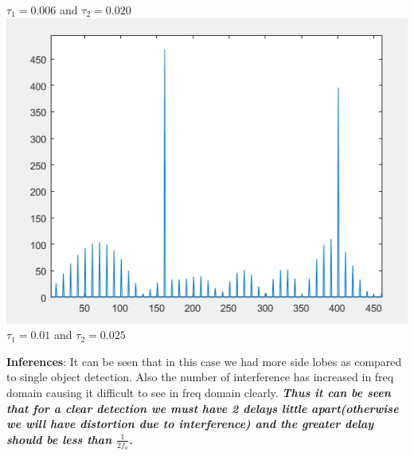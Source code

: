 \documentclass[12pt]{article}
\begin{document}
\begin{flushleft}
\begin{center}
    $\tau_1= 0.006$ and $\tau_2=0.020$\\
    \includegraphics[scale = 0.75]{c.PNG}\\[1.0 cm]
    $\tau_1= 0.01$ and $\tau_2=0.025$\\
\end{center}
\textbf{Inferences}:
It can be seen that in this case we had more side lobes as compared to single object detection. Also the number of interference has increased in freq domain causing it difficult to see in freq domain clearly. \textit{\textbf{Thus it can be seen that for a clear detection we must have 2 delays little apart(otherwise we will have distortion due to interference) and the greater delay should be less than $\frac{1}{2f_o}$.}}
\end{flushleft}
\end{document}
